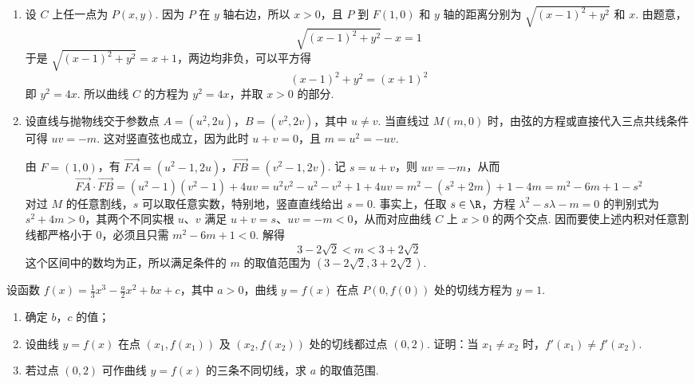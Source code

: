 \begin{solution}
\begin{enumerate}
\item 设 \(C\) 上任一点为 \(P(x,y)\). 因为 \(P\) 在 \(y\) 轴右边，所以 \(x>0\)，且 \(P\) 到 \(F(1,0)\) 和 \(y\) 轴的距离分别为 \(\sqrt{(x-1)^2+y^2}\) 和 \(x\). 由题意，
\[
\sqrt{(x-1)^2+y^2}-x=1
\]
于是 \(\sqrt{(x-1)^2+y^2}=x+1\)，两边均非负，可以平方得
\[
(x-1)^2+y^2=(x+1)^2
\]
即 \(y^2=4x\). 所以曲线 \(C\) 的方程为 \(y^2=4x\)，并取 \(x>0\) 的部分.
\item 设直线与抛物线交于参数点 \(A=(u^2,2u)\)，\(B=(v^2,2v)\)，其中 \(u\neq v\). 当直线过 \(M(m,0)\) 时，由弦的方程或直接代入三点共线条件可得 \(uv=-m\). 这对竖直弦也成立，因为此时 \(u+v=0\)，且 \(m=u^2=-uv\).

由 \(F=(1,0)\)，有
\(\overrightarrow{FA}=(u^2-1,2u)\)，\(\overrightarrow{FB}=(v^2-1,2v)\).
记 \(s=u+v\)，则 \(uv=-m\)，从而
\[
\overrightarrow{FA}\cdot\overrightarrow{FB}=(u^2-1)(v^2-1)+4uv=u^2v^2-u^2-v^2+1+4uv=m^2-(s^2+2m)+1-4m=m^2-6m+1-s^2
\]
对过 \(M\) 的任意割线，\(s\) 可以取任意实数，特别地，竖直直线给出 \(s=0\). 事实上，任取 \(s\in\R\)，方程 \(\lambda^2-s\lambda-m=0\) 的判别式为 \(s^2+4m>0\)，其两个不同实根 \(u\)、\(v\) 满足 \(u+v=s\)、\(uv=-m<0\)，从而对应曲线 \(C\) 上 \(x>0\) 的两个交点. 因而要使上述内积对任意割线都严格小于 \(0\)，必须且只需 \(m^2-6m+1<0\). 解得
\[
3-2\sqrt{2}<m<3+2\sqrt{2}
\]
这个区间中的数均为正，所以满足条件的 \(m\) 的取值范围为 \((3-2\sqrt{2},3+2\sqrt{2})\).
\end{enumerate}
\end{solution}

\begin{problem}
设函数 \( f(x) = \frac{1}{3} x^3 - \frac{a}{2} x^2 + bx + c \)，其中 \( a > 0 \)，曲线 \( y = f(x) \) 在点 \( P(0, f(0)) \) 处的切线方程为 \( y = 1 \).
\begin{enumerate}
\item 确定 \(b\)，\(c\) 的值；
\item 设曲线 \( y = f(x) \) 在点 \( (x_1, f(x_1)) \) 及 \( (x_2, f(x_2)) \) 处的切线都过点 \((0,2)\). 证明：当 \( x_1 \neq x_2 \) 时，\( f'(x_1) \neq f'(x_2)\).
\item 若过点 \((0,2)\) 可作曲线 \( y = f(x) \) 的三条不同切线，求 \(a\) 的取值范围.
\end{enumerate}
\end{problem}

